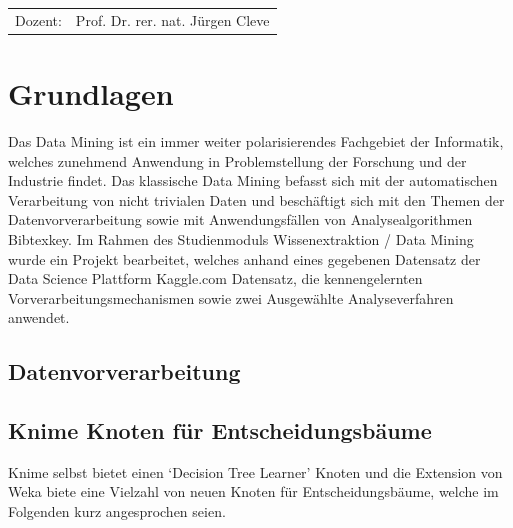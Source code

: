 \documentclass[12pt,					%
							 oneside,			%
							 a4paper,			%
							 halfparskip,		%
							 liststotoc,			%
							 bibtotoc,			%
							 fleqn,				%
							 pointlessnumbers]	%
							 {scrreprt}
\newcommand{\Betreuer}{Prof. Dr. rer. nat. Jürgen Cleve}
\newcommand{\blankpage}{
	\newpage
}
\begin{document}
\begin{titlepage}
\begin{center}
\begin{table}[b]
\begin{tabular}{rl}
					Dozent: & \Betreuer \\

				\end{tabular}
			\end{table}
		\end{center}
	\end{titlepage}

	\onehalfspacing 					%
	

	
\newpage

\tableofcontents 					%
	
\chapter{Grundlagen}

Das Data Mining ist ein immer weiter polarisierendes Fachgebiet der Informatik, welches zunehmend Anwendung in Problemstellung der Forschung und der Industrie findet. Das klassische Data Mining befasst sich mit der automatischen Verarbeitung von nicht trivialen Daten und beschäftigt sich mit den Themen der Datenvorverarbeitung sowie mit Anwendungsfällen von Analysealgorithmen Bibtexkey\cite{Cleve2020}. Im Rahmen des Studienmoduls \glqq{}Wissenextraktion / Data Mining\grqq{} wurde ein Projekt bearbeitet, welches anhand eines gegebenen Datensatz der Data Science Plattform Kaggle.com Datensatz, die kennengelernten Vorverarbeitungsmechanismen sowie zwei Ausgewählte Analyseverfahren anwendet. 

	\section{Datenvorverarbeitung}
	
	\section{Knime Knoten für Entscheidungsbäume}\label{tree:dec:nodes}
		Knime selbst bietet einen `Decision Tree Learner' Knoten und die Extension von Weka biete eine Vielzahl von neuen Knoten für Entscheidungsbäume, welche im Folgenden kurz angesprochen seien.
	
\end{document}
